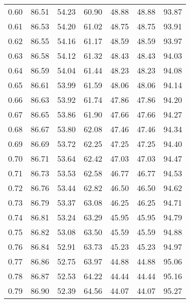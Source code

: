 \begin{tabular}{|c|c|c|c|c|c|c|}
      0.60 &     86.51 &     54.23 &      60.90 &   48.88 &      48.88 &         93.87 \\
      0.61 &     86.53 &     54.20 &      61.02 &   48.75 &      48.75 &         93.91 \\
      0.62 &     86.55 &     54.16 &      61.17 &   48.59 &      48.59 &         93.97 \\
      0.63 &     86.58 &     54.12 &      61.32 &   48.43 &      48.43 &         94.03 \\
      0.64 &     86.59 &     54.04 &      61.44 &   48.23 &      48.23 &         94.08 \\
      0.65 &     86.61 &     53.99 &      61.59 &   48.06 &      48.06 &         94.14 \\
      0.66 &     86.63 &     53.92 &      61.74 &   47.86 &      47.86 &         94.20 \\
      0.67 &     86.65 &     53.86 &      61.90 &   47.66 &      47.66 &         94.27 \\
      0.68 &     86.67 &     53.80 &      62.08 &   47.46 &      47.46 &         94.34 \\
      0.69 &     86.69 &     53.72 &      62.25 &   47.25 &      47.25 &         94.40 \\
      0.70 &     86.71 &     53.64 &      62.42 &   47.03 &      47.03 &         94.47 \\
      0.71 &     86.73 &     53.53 &      62.58 &   46.77 &      46.77 &         94.53 \\
      0.72 &     86.76 &     53.44 &      62.82 &   46.50 &      46.50 &         94.62 \\
      0.73 &     86.79 &     53.37 &      63.08 &   46.25 &      46.25 &         94.71 \\
      0.74 &     86.81 &     53.24 &      63.29 &   45.95 &      45.95 &         94.79 \\
      0.75 &     86.82 &     53.08 &      63.50 &   45.59 &      45.59 &         94.88 \\
      0.76 &     86.84 &     52.91 &      63.73 &   45.23 &      45.23 &         94.97 \\
      0.77 &     86.86 &     52.75 &      63.97 &   44.88 &      44.88 &         95.06 \\
      0.78 &     86.87 &     52.53 &      64.22 &   44.44 &      44.44 &         95.16 \\
      0.79 &     86.90 &     52.39 &      64.56 &   44.07 &      44.07 &         95.27 \\

\end{tabular}
